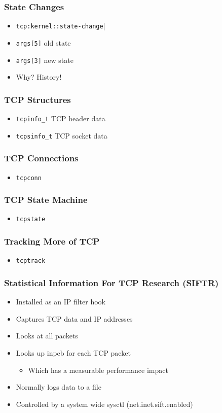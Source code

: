 \documentclass[pdftex]{beamer}
\begin{document}
\begin{frame}[fragile]
  \frametitle{State Changes}
  \begin{itemize}
  \item \verb|tcp:kernel::state-change||
  \item \verb|args[5]| old state
  \item \verb|args[3]| new state
  \item Why?  History!
  \end{itemize}
\end{frame}

\begin{frame}[fragile]
  \frametitle{TCP Structures}
  \begin{itemize}
  \item \verb|tcpinfo_t| TCP header data
  \item \verb|tcpsinfo_t| TCP socket data
  \end{itemize}
\end{frame}

\begin{frame}[fragile]
  \frametitle{TCP Connections}
  \begin{itemize}
  \item \verb|tcpconn|
  \end{itemize}
\end{frame}

\begin{frame}[fragile]
  \frametitle{TCP State Machine}
  \begin{itemize}
  \item \verb|tcpstate|
  \end{itemize}
\end{frame}

\begin{frame}[fragile]
  \frametitle{Tracking More of TCP}
  \begin{itemize}
  \item \verb|tcptrack|
  \end{itemize}
\end{frame}

\begin{frame}
  \frametitle{Statistical Information For TCP Research (SIFTR)}
  \begin{itemize}
  \item Installed as an IP filter hook
  \item Captures TCP data and IP addresses
  \item Looks at all packets
  \item Looks up inpcb for each TCP packet
    \begin{itemize}
    \item Which has a measurable performance impact
    \end{itemize}
  \item Normally logs data to a file
  \item Controlled by a system wide sysctl (net.inet.sift.enabled)
  \end{itemize}
\end{frame}
\end{document}
